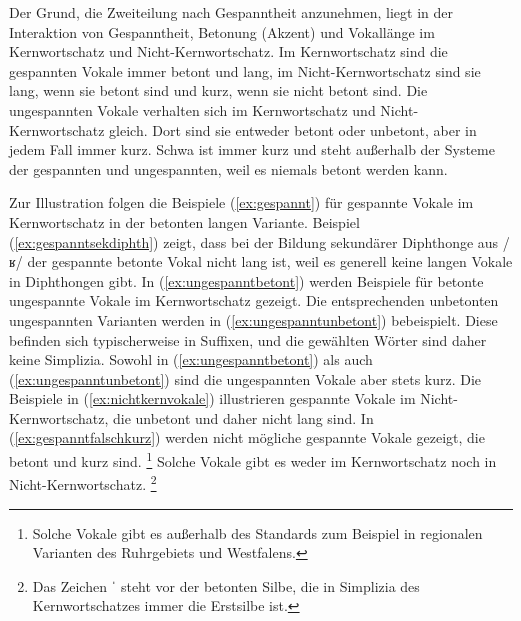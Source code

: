Der Grund, die Zweiteilung nach Gespanntheit anzunehmen, liegt in der Interaktion von Gespanntheit, Betonung (Akzent) und Vokallänge im Kernwortschatz und Nicht-Kernwortschatz.
Im Kernwortschatz sind die gespannten Vokale immer betont und lang, im Nicht-Kernwortschatz sind sie lang, wenn sie betont sind und kurz, wenn sie nicht betont sind.
Die ungespannten Vokale verhalten sich im Kernwortschatz und Nicht-Kernwortschatz gleich.
Dort sind sie entweder betont oder unbetont, aber in jedem Fall immer kurz.
Schwa ist immer kurz und steht außerhalb der Systeme der gespannten und ungespannten, weil es niemals betont werden kann.

Zur Illustration folgen die Beispiele (\ref{ex:gespannt}) für gespannte Vokale im Kernwortschatz in der betonten langen Variante.
Beispiel (\ref{ex:gespanntsekdiphth}) zeigt, dass bei der Bildung sekundärer Diphthonge aus /ʁ/ der gespannte betonte Vokal nicht lang ist, weil es generell keine langen Vokale in Diphthongen gibt.
In (\ref{ex:ungespanntbetont}) werden Beispiele für betonte ungespannte Vokale im Kernwortschatz gezeigt.
Die entsprechenden unbetonten ungespannten Varianten werden in (\ref{ex:ungespanntunbetont}) bebeispielt.
Diese befinden sich typischerweise in Suffixen, und die gewählten Wörter sind daher keine Simplizia.
Sowohl in (\ref{ex:ungespanntbetont}) als auch (\ref{ex:ungespanntunbetont}) sind die ungespannten Vokale aber stets kurz.
Die Beispiele in (\ref{ex:nichtkernvokale}) illustrieren gespannte Vokale im Nicht-Kernwortschatz, die unbetont und daher nicht lang sind.
In (\ref{ex:gespanntfalschkurz}) werden nicht mögliche gespannte Vokale gezeigt, die betont und kurz sind.%
\footnote{Solche Vokale gibt es außerhalb des Standards zum Beispiel in regionalen Varianten des Ruhrgebiets und Westfalens.}
Solche Vokale gibt es weder im Kernwortschatz noch in Nicht-Kernwortschatz.%
\footnote{Das Zeichen ˈ steht vor der betonten Silbe, die in Simplizia des Kernwortschatzes immer die Erstsilbe ist.}


